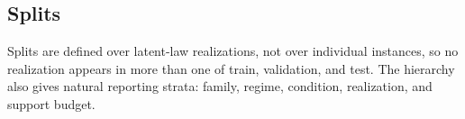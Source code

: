 \subsection{Splits}

Splits are defined over latent-law realizations, not over individual instances, so no realization appears in more than one of train, validation, and test.  The hierarchy also gives natural reporting strata: family, regime, condition, realization, and support budget.

